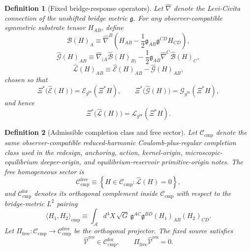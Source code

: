 \documentclass[11pt]{article}
\newcommand{\Sub}{\mathcal A}
\newcommand{\ObserverMap}{\Xi}
\newcommand{\BridgeMetric}{\mathfrak g}
\newcommand{\ObserverMetric}{g^{\mathrm{br}}}
\newcommand{\ResidualLift}{\widehat{\mathcal V}^{\mathrm{res}}}
\newcommand{\SubEinLin}{\widehat{\mathcal E}}
\newcommand{\SubGaugeVec}{\widehat{\mathcal B}}
\newcommand{\SubGaugeBook}{\widehat{\mathcal G}}
\newcommand{\SubReducedEin}{\widehat{\mathcal L}}
\newcommand{\FreeProj}{\Pi_{\mathrm{free}}}
\newcommand{\ReducedEin}{\mathcal L_{\ObserverMetric}}
\newcommand{\GaugeBook}{\mathcal G_{\ObserverMetric}}
\newcommand{\EinLin}{\mathcal E_{\ObserverMetric}}
\newcommand{\CompClass}{\mathscr C_{\mathrm{cmp}}}
\newcommand{\CompFree}{\mathscr C_{\mathrm{cmp}}^{\mathrm{free}}}
\newcommand{\CompForced}{\mathscr C_{\mathrm{cmp}}^{\mathrm{for}}}
\newtheorem{definition}{Definition}
\begin{document}
\begin{definition}[Fixed bridge-response operators]
\label{def:operators}
Let \(\widehat\nabla\) denote the Levi-Civita connection of the unshifted bridge metric \(\BridgeMetric\). For any observer-compatible symmetric substrate tensor \(H_{AB}\), define
\begin{equation}
\SubGaugeVec(H)_A
\equiv
\widehat\nabla^B\!\left(
H_{AB}
-\frac12 \BridgeMetric_{AB}\BridgeMetric^{CD}H_{CD}
\right),
\label{eq:subB}
\end{equation}
\begin{equation}
\SubGaugeBook(H)_{AB}
\equiv
\widehat\nabla_{(A}\SubGaugeVec(H)_{B)}
-\frac12 \BridgeMetric_{AB}\widehat\nabla^C\SubGaugeVec(H)_C,
\label{eq:subG}
\end{equation}
\begin{equation}
\SubReducedEin(H)_{AB}
\equiv
\SubEinLin(H)_{AB}-\SubGaugeBook(H)_{AB},
\label{eq:subL}
\end{equation}
chosen so that
\begin{equation}
\ObserverMap^*\bigl(\SubEinLin(H)\bigr)=\EinLin(\ObserverMap^*H),
\qquad
\ObserverMap^*\bigl(\SubGaugeBook(H)\bigr)=\GaugeBook(\ObserverMap^*H),
\label{eq:intertwine1}
\end{equation}
and hence
\begin{equation}
\ObserverMap^*\bigl(\SubReducedEin(H)\bigr)
=
\ReducedEin(\ObserverMap^*H).
\label{eq:intertwine2}
\end{equation}
\end{definition}

\begin{definition}[Admissible completion class and free sector]
\label{def:class}
Let \(\CompClass\) denote the same observer-compatible reduced-harmonic Coulomb-plus-regular completion class used in the redesign, anchoring, action, kernel-origin, microscopic-equilibrium deeper-origin, and equilibrium-reservoir primitive-origin notes. The free homogeneous sector is
\begin{equation}
\CompFree
\equiv
\left\{
H\in\CompClass:\SubReducedEin(H)=0
\right\},
\label{eq:freeclass}
\end{equation}
and \(\CompForced\) denotes its orthogonal complement inside \(\CompClass\) with respect to the bridge-metric \(L^2\) pairing
\begin{equation}
\langle H_1,H_2\rangle_{\mathrm{cmp}}
\equiv
\int_{\Sub} d^4X\,\sqrt{G}\,
\BridgeMetric^{AC}\BridgeMetric^{BD}(H_1)_{AB}(H_2)_{CD}.
\label{eq:inner}
\end{equation}
Let \(\FreeProj:\CompClass\to\CompFree\) be the orthogonal projector. The fixed source satisfies
\begin{equation}
\ResidualLift\in\CompForced,
\qquad
\FreeProj\ResidualLift=0.
\label{eq:sourcefree}
\end{equation}
\end{definition}
\end{document}
